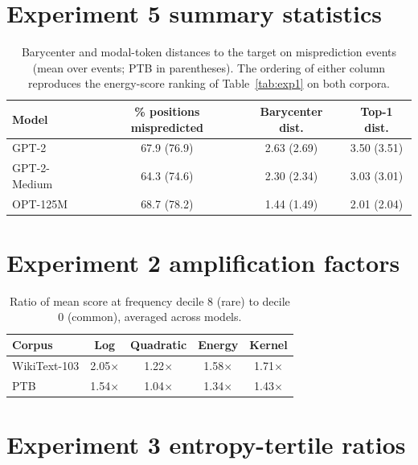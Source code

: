 \documentclass{article}
\begin{document}
\section{Experiment 5 summary statistics}
\label{app:exp5}

\begin{table}[H]
  \caption{Barycenter and modal-token distances to the target on misprediction events
  (mean over events; PTB in parentheses). The ordering of either column reproduces the
  energy-score ranking of Table~\ref{tab:exp1} on both corpora.}
  \label{tab:exp5app}
  \centering
  \small
  \begin{tabular}{lccc}
    \toprule
    Model & \% positions mispredicted & Barycenter dist. & Top-1 dist. \\
    \midrule
    GPT-2        & 67.9 (76.9) & 2.63 (2.69) & 3.50 (3.51) \\
    GPT-2-Medium & 64.3 (74.6) & 2.30 (2.34) & 3.03 (3.01) \\
    OPT-125M     & 68.7 (78.2) & 1.44 (1.49) & 2.01 (2.04) \\
    \bottomrule
  \end{tabular}
\end{table}

\section{Experiment 2 amplification factors}
\label{app:amp}

\begin{table}[H]
  \caption{Ratio of mean score at frequency decile 8 (rare) to decile 0 (common),
  averaged across models.}
  \label{tab:amp}
  \centering
  \small
  \begin{tabular}{lcccc}
    \toprule
    Corpus & Log & Quadratic & Energy & Kernel \\
    \midrule
    WikiText-103 & 2.05$\times$ & 1.22$\times$ & 1.58$\times$ & 1.71$\times$ \\
    PTB          & 1.54$\times$ & 1.04$\times$ & 1.34$\times$ & 1.43$\times$ \\
    \bottomrule
  \end{tabular}
\end{table}

\section{Experiment 3 entropy-tertile ratios}
\label{app:entropy}
\end{document}
